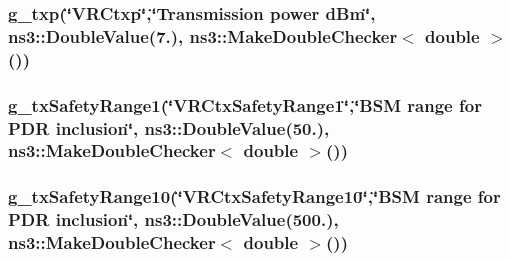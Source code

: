 \subsubsection[{\texorpdfstring{g\+\_\+txp}{g_txp}}]{ g\+\_\+txp(\char`\"{}V\+R\+Ctxp\char`\"{},\char`\"{}Transmission power {\bf d\+Bm}\char`\"{}, ns3\+::\+Double\+Value(7.), {\bf ns3\+::\+Make\+Double\+Checker}$<$ double $>$())\hspace{0.3cm}{\ttfamily [static]}}\hypertarget{vanet-routing-compare_8cc_a9689fcc6cd4744bb0fee4559a7baef89}{}\label{vanet-routing-compare_8cc_a9689fcc6cd4744bb0fee4559a7baef89}
\subsubsection[{\texorpdfstring{g\+\_\+tx\+Safety\+Range1}{g_txSafetyRange1}}]{ g\+\_\+tx\+Safety\+Range1(\char`\"{}V\+R\+Ctx\+Safety\+Range1\char`\"{},\char`\"{}B\+SM range for P\+DR inclusion\char`\"{}, ns3\+::\+Double\+Value(50.), {\bf ns3\+::\+Make\+Double\+Checker}$<$ double $>$())\hspace{0.3cm}{\ttfamily [static]}}\hypertarget{vanet-routing-compare_8cc_a25cdd03b03a3a5add504c89cc7204db8}{}\label{vanet-routing-compare_8cc_a25cdd03b03a3a5add504c89cc7204db8}
\subsubsection[{\texorpdfstring{g\+\_\+tx\+Safety\+Range10}{g_txSafetyRange10}}]{ g\+\_\+tx\+Safety\+Range10(\char`\"{}V\+R\+Ctx\+Safety\+Range10\char`\"{},\char`\"{}B\+SM range for P\+DR inclusion\char`\"{}, ns3\+::\+Double\+Value(500.), {\bf ns3\+::\+Make\+Double\+Checker}$<$ double $>$())\hspace{0.3cm}{\ttfamily [static]}}\hypertarget{vanet-routing-compare_8cc_a01a56ff298e16d5824ba329baab1ff26}{}\label{vanet-routing-compare_8cc_a01a56ff298e16d5824ba329baab1ff26}
